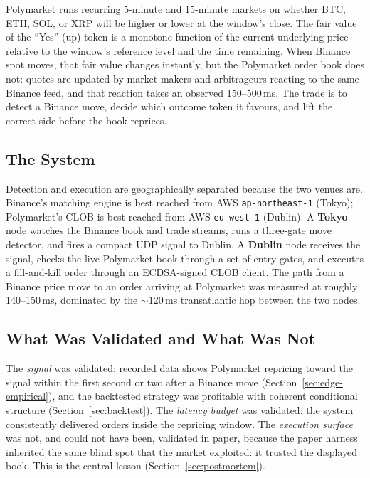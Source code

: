 \documentclass{tmsce}
\begin{document}
Polymarket runs recurring 5-minute and 15-minute markets on whether BTC, ETH, SOL,
or XRP will be higher or lower at the window's close. The fair value of the ``Yes''
(up) token is a monotone function of the current underlying price relative to the
window's reference level and the time remaining. When Binance spot moves, that fair
value changes instantly, but the Polymarket order book does not: quotes are updated
by market makers and arbitrageurs reacting to the same Binance feed, and that
reaction takes an observed 150--500\,ms. The trade is to detect a Binance move,
decide which outcome token it favours, and lift the correct side before the book
reprices.

\subsection{The System}

Detection and execution are geographically separated because the two venues are.
Binance's matching engine is best reached from AWS \texttt{ap-northeast-1} (Tokyo);
Polymarket's CLOB is best reached from AWS \texttt{eu-west-1} (Dublin). A
\textbf{Tokyo} node watches the Binance book and trade streams, runs a three-gate
move detector, and fires a compact UDP signal to Dublin. A \textbf{Dublin} node
receives the signal, checks the live Polymarket book through a set of entry gates,
and executes a fill-and-kill order through an ECDSA-signed CLOB client. The path from
a Binance price move to an order arriving at Polymarket was measured at roughly
140--150\,ms, dominated by the $\sim$120\,ms transatlantic hop between the two nodes.

\subsection{What Was Validated and What Was Not}

The \emph{signal} was validated: recorded data shows Polymarket repricing toward the
signal within the first second or two after a Binance move
(Section~\ref{sec:edge-empirical}), and the backtested strategy was profitable with
coherent conditional structure (Section~\ref{sec:backtest}). The \emph{latency
budget} was validated: the system consistently delivered orders inside the repricing
window. The \emph{execution surface} was not, and could not have been, validated in
paper, because the paper harness inherited the same blind spot that the market
exploited: it trusted the displayed book. This is the central lesson
(Section~\ref{sec:postmortem}).
\end{document}
